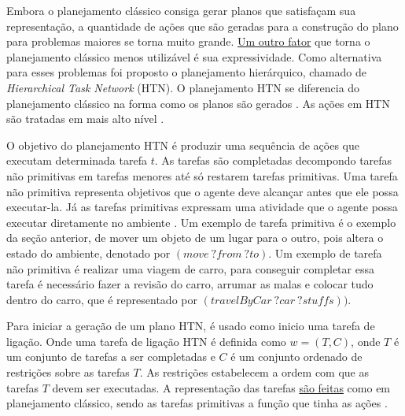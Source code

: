 Embora o planejamento clássico consiga gerar planos que satisfaçam sua representação, a quantidade de ações que são geradas para a construção do plano para problemas maiores se torna muito grande. 
\underline{Um outro fator}  que torna o planejamento clássico menos utilizável é sua expressividade. 
Como alternativa para esses problemas foi proposto o planejamento hierárquico, chamado de \textit{Hierarchical Task Network} (HTN). 
O planejamento HTN se diferencia do planejamento clássico na forma como os planos são gerados \cite{ghallab2004automated}. 
As ações em HTN são tratadas em mais alto nível \cite{intelligence2003modern}.  

O objetivo do planejamento HTN é produzir uma sequência de ações que executam determinada tarefa $t$. 
As tarefas são completadas decompondo tarefas não primitivas em tarefas menores até só restarem tarefas primitivas. 
Uma tarefa não primitiva representa objetivos que o agente deve alcançar antes que ele possa executar-la. 
Já as tarefas primitivas expressam uma atividade que o agente possa executar diretamente no ambiente \cite{intelligence2003modern}. 
Um exemplo de tarefa primitiva é o exemplo da seção anterior, de mover um objeto de um lugar para o outro, pois altera o estado do ambiente, denotado por $(move~ ?from~ ?to)$. 
Um exemplo de tarefa não primitiva é realizar uma viagem de carro, para conseguir completar essa tarefa é necessário fazer a revisão do carro, arrumar as malas e colocar tudo dentro do carro, que é representado por $(travelByCar ~?car~ ?stuffs))$. 

Para iniciar a geração de um plano HTN, é usado como inicio uma tarefa de ligação. 
Onde uma tarefa de ligação HTN é definida como $w = (T, C)$, onde $T$ é um conjunto de tarefas a ser completadas e $C$ é um conjunto ordenado de restrições sobre as tarefas $T$. 
As restrições estabelecem a ordem com que as tarefas $T$ devem ser executadas. 
A representação das tarefas \underline{são feitas} como em planejamento clássico, sendo as tarefas primitivas a função que tinha as ações \cite{meneguzzi2015planning}.  

